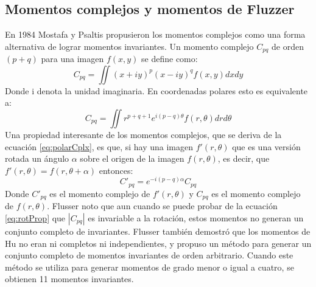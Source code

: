 \documentclass[a4paper, 11pt, oneside]{report}
\begin{document}
\subsection{Momentos complejos y momentos de Fluzzer}
En 1984 Mostafa y Psaltis \cite{mostaf84} propusieron los momentos complejos como una forma alternativa de lograr momentos invariantes. Un momento complejo $C_{pq}$ de orden $(p+q)$ para una imagen $f(x,y)$ se define como:
\[ C_{pq} = \iint{ (x+iy)^p (x-iy)^q f(x,y) dx dy } \]
Donde i denota la unidad imaginaria. En coordenadas polares esto es equivalente a:
\begin{equation}\label{eq:polarCplx}
C_{pq} = \iint{ r^{p+q+1}e^{i(p-q)\theta}f(r,\theta) dr d\theta }
\end{equation}
Una propiedad interesante de los momentos complejos, que se deriva de la ecuación \ref{eq:polarCplx}, es que, si hay una imagen $f'(r,\theta)$ que es una versión rotada un ángulo $\alpha$ sobre el origen de la imagen $f(r,\theta)$, es decir, que $f'(r,\theta) = f(r,\theta+\alpha)$ entonces:
\begin{equation}\label{eq:rotProp}
C'_{pq} = e^{-i(p-q)\alpha}C_{pq}
\end{equation}
Donde $C'_{pq}$ es el momento complejo de $f'(r,\theta)$ y $C_{pq}$ es el momento complejo de $f(r,\theta)$. Flusser noto\cite{flusser99} que aun cuando se puede probar de la ecuación \ref{eq:rotProp} que $|C_{pq}|$ es invariable a la rotación, estos momentos no generan un conjunto completo de invariantes. Flusser también demostró que los momentos de Hu no eran ni completos ni independientes, y propuso un método para generar un conjunto completo de momentos invariantes de orden arbitrario. Cuando este método se utiliza para generar momentos de grado menor o igual a cuatro, se obtienen 11 momentos invariantes.
\end{document}
